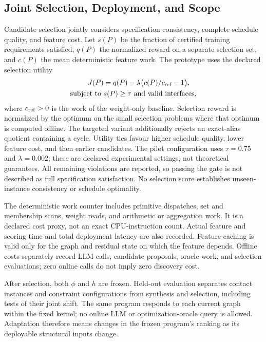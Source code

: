 \subsection{Joint Selection, Deployment, and Scope}
\label{sec:method:selection}

Candidate selection jointly considers specification consistency,
complete-schedule quality, and feature cost. Let $s(P)$ be the fraction of
certified training requirements satisfied, $q(P)$ the normalized reward on
a separate selection set, and $c(P)$ the mean deterministic feature work.
The prototype uses the declared selection utility
\begin{equation}
 \begin{split}
 J(P)&=q(P)-\lambda\bigl(c(P)/c_{\rm ref}-1\bigr),\\
 \text{subject to }&s(P)\geq\tau\text{ and valid interfaces},
 \end{split}
 \label{eq:method:utility}
\end{equation}
where $c_{\rm ref}>0$ is the work of the weight-only baseline. Selection
reward is normalized by the optimum on the small selection problems where
that optimum is computed offline. The targeted variant additionally rejects
an exact-alias quotient containing a cycle. Utility ties favour higher
schedule quality, lower feature cost, and then earlier candidates.
The pilot configuration uses $\tau=0.75$ and $\lambda=0.002$; these are
declared experimental settings, not theoretical guarantees. All remaining
violations are reported, so passing the gate is not described as full
specification satisfaction. No selection score establishes unseen-instance
consistency or schedule optimality.

The deterministic work counter includes primitive dispatches, set and
membership scans, weight reads, and arithmetic or aggregation work. It is
a declared cost proxy, not an exact CPU-instruction count. Actual feature
and scoring time and total deployment latency are also recorded.
Feature caching is valid only for the graph and residual state on which
the feature depends. Offline costs separately
record LLM calls, candidate proposals, oracle work, and selection evaluations;
zero online calls do not imply zero discovery cost.

After selection, both $\phi$ and $h$ are frozen. Held-out evaluation separates
contact instances and constraint configurations from synthesis and selection,
including tests of their joint shift. The same program responds to each
current graph within the fixed kernel; no online LLM or optimization-oracle
query is allowed. Adaptation therefore means changes in the frozen program's
ranking as its deployable structural inputs change.

